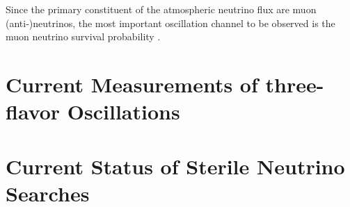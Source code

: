 Since the primary constituent of the atmospheric neutrino flux are muon (anti-)neutrinos, the most important oscillation channel to be observed is the muon neutrino survival probability . 
\section{Current Measurements of three-flavor Oscillations}
\section{Current Status of Sterile Neutrino Searches}
